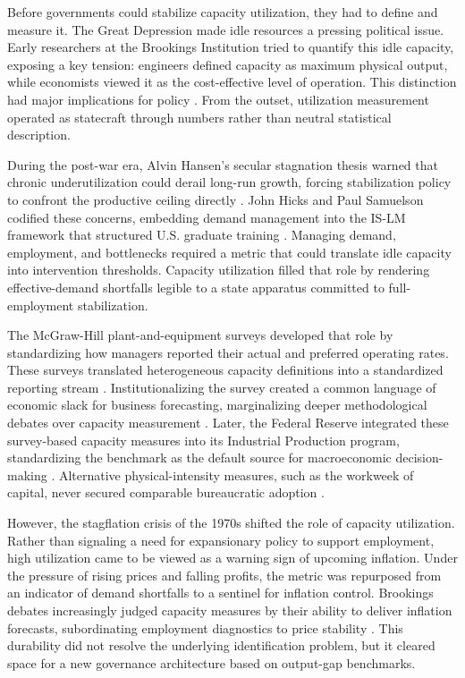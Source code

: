 \documentclass[11pt]{article}
\begin{document}
Before governments could stabilize capacity utilization, they had to define and measure it. The Great Depression made idle resources a pressing political issue. Early researchers at the Brookings Institution tried to quantify this idle capacity, exposing a key tension: engineers defined capacity as maximum physical output, while economists viewed it as the cost-effective level of operation. This distinction had major implications for policy \citep{Burns1954, KleinDavid1958}. From the outset, utilization measurement operated as statecraft through numbers rather than neutral statistical description.

During the post-war era, Alvin Hansen's secular stagnation thesis warned that chronic underutilization could derail long-run growth, forcing stabilization policy to confront the productive ceiling directly \citep{Hansen1936, Hansen1941, Barber1987}. John Hicks and Paul Samuelson codified these concerns, embedding demand management into the IS-LM framework that structured U.S. graduate training \citep{Hicks1937, Samuelson1947, Samuelson1948}. Managing demand, employment, and bottlenecks required a metric that could translate idle capacity into intervention thresholds. Capacity utilization filled that role by rendering effective-demand shortfalls legible to a state apparatus committed to full-employment stabilization.

The McGraw-Hill plant-and-equipment surveys developed that role by standardizing how managers reported their actual and preferred operating rates. These surveys translated heterogeneous capacity definitions into a standardized reporting stream \citep{Butler1958, Phillips1963}. Institutionalizing the survey created a common language of economic slack for business forecasting, marginalizing deeper methodological debates over capacity measurement \citep{BaranSweezy1988, Munroe2007}. Later, the Federal Reserve integrated these survey-based capacity measures into its Industrial Production program, standardizing the benchmark as the default source for macroeconomic decision-making \citep{Board2017}. Alternative physical-intensity measures, such as the workweek of capital, never secured comparable bureaucratic adoption \citep{Foss1963, TaubmanGottschalk1971}.

However, the stagflation crisis of the 1970s shifted the role of capacity utilization. Rather than signaling a need for expansionary policy to support employment, high utilization came to be viewed as a warning sign of upcoming inflation. Under the pressure of rising prices and falling profits, the metric was repurposed from an indicator of demand shortfalls to a sentinel for inflation control. Brookings debates increasingly judged capacity measures by their ability to deliver inflation forecasts, subordinating employment diagnostics to price stability \citep{KleinEtAl1973}. This durability did not resolve the underlying identification problem, but it cleared space for a new governance architecture based on output-gap benchmarks.
\end{document}
